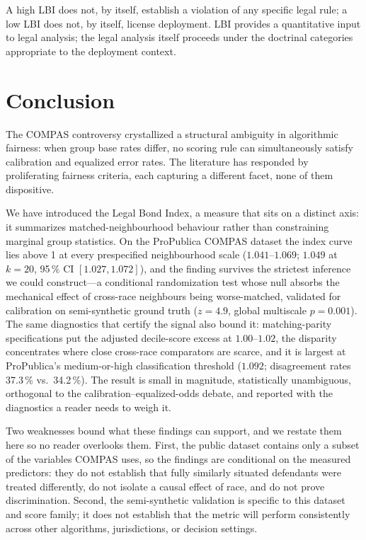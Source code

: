 \documentclass[11pt]{article}
\begin{document}
A high LBI does not, by itself, establish a violation of any
specific legal rule; a low LBI does not, by itself, license
deployment. LBI provides a quantitative input to legal analysis; the
legal analysis itself proceeds under the doctrinal categories
appropriate to the deployment context.


\section{Conclusion}
\label{sec:conclusion}

The COMPAS controversy crystallized a structural ambiguity in
algorithmic fairness: when group base rates differ,
no scoring rule can simultaneously satisfy calibration and equalized
error rates. The literature has responded by proliferating fairness
criteria, each capturing a different facet, none of them dispositive.

We have introduced the Legal Bond Index, a measure that sits on a
distinct axis: it summarizes matched-neighbourhood behaviour rather
than constraining marginal group statistics. On the ProPublica COMPAS
dataset the index curve lies above 1 at every prespecified
neighbourhood scale ($1.041$--$1.069$; $1.049$ at $k = 20$, 95\,\% CI
$[1.027, 1.072]$), and the finding survives the strictest inference
we could construct---a conditional randomization test whose null
absorbs the mechanical effect of cross-race neighbours being
worse-matched, validated for calibration on semi-synthetic ground
truth ($z = 4.9$, global multiscale $p = 0.001$). The same
diagnostics that certify the signal also bound it: matching-parity
specifications put the adjusted decile-score excess at $1.00$--$1.02$,
the disparity concentrates where close cross-race comparators are
scarce, and it is largest at ProPublica's medium-or-high
classification threshold ($1.092$; disagreement rates 37.3\,\% vs.\
34.2\,\%). The result is small in magnitude, statistically
unambiguous, orthogonal to the calibration--equalized-odds debate,
and reported with the diagnostics a reader needs to weigh it.

Two weaknesses bound what these findings can support, and we restate
them here so no reader overlooks them. First, the public dataset
contains only a subset of the variables COMPAS uses, so the findings
are conditional on the measured predictors: they do not establish
that fully similarly situated defendants were treated differently,
do not isolate a causal effect of race, and do not prove
discrimination. Second, the semi-synthetic validation is specific to
this dataset and score family; it does not establish that the metric
will perform consistently across other algorithms, jurisdictions, or
decision settings.
\end{document}
